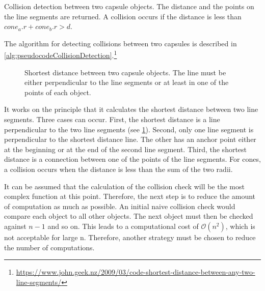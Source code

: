 \begin{lstfloat}[!t]
\caption{Collision detection between two capsule objects. The distance and the points on the line segments are returned. A collision occurs if the distance is less than $\mathit{cone_a.r}+\mathit{cone_b.r} > d$.}
\label{alg:pseudocodeCollisionDetection}
\end{lstfloat}
% 
The algorithm for detecting collisions between two capsules is described in \cref{alg:pseudocodeCollisionDetection}.\footnote{\href{https://www.john.geek.nz/2009/03/code-shortest-distance-between-any-two-line-segments/}{https://www.john.geek.nz/2009/03/code-shortest-distance-between-any-two-line-segments/}}
%
\begin{figure}[!t]
    \centering
    \def\tikzheight{0.5\textwidth}
	\caption{Shortest distance between two capsule objects. The line must be either perpendicular to the line segments or at least in one of the points of each object.}
	\label{fig:shortDist}
\end{figure}
%
It works on the principle that it calculates the shortest distance between two line segments.
Three cases can occur.
First, the shortest distance is a line perpendicular to the two line segments (see \cref{fig:shortDist}).
Second, only one line segment is perpendicular to the shortest distance line.
The other has an anchor point either at the beginning or at the end of the second line segment.
Third, the shortest distance is a connection between one of the points of the line segments.
For cones, a collision occurs when the distance is less than the sum of the two radii.
\par
% 
It can be assumed that the calculation of the collision check will be the most complex function at this point.
Therefore, the next step is to reduce the amount of computation as much as possible.
An initial naive collision check would compare each object to all other objects.
The next object must then be checked against $n-1$ and so on.
This leads to a computational cost of $\mathcal{O}(n^{2})$, which is not acceptable for large n.
Therefore, another strategy must be chosen to reduce the number of computations.
%
% 
% 
